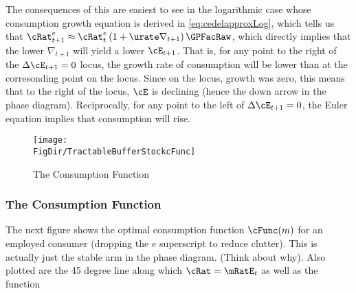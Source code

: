 \documentclass{\handout}
\begin{document}
The consequences of this are easiest to see in the logarithmic case whose consumption growth equation is derived in \eqref{eq:cedelapproxLog}, which tells us that ${\cRat}^{e}_{t+1} \approx {\cRat}^{e}_{t}\left(1+ \urate \nabla _{t+1}\right) {\GPFacRaw}$, which directly 
implies that the lower $\nabla_{t+1}$ will yield a lower $\cE_{t+1}$.  That is, for any point to the right of the $\Delta \cE_{t+1}=0$ locus, the growth rate of consumption will be lower than at the corresonding point on the locus.  Since on the locus, growth
was zero, this means that to the right of the locus, $\cE$ is declining (hence the down arrow in the phase diagram).  Reciprocally, for any point to the left of $\Delta \cE_{t+1}=0$, the Euler equation implies that consumption will rise.

\begin{figure}
\caption{The Consumption Function}\label{fig:cFunc}
\texttt{[image: \\FigDir/TractableBufferStockcFunc]}
\end{figure}

\subsubsection{The Consumption Function}
The next figure shows the optimal consumption function $\cFunc(m)$ for an
employed consumer (dropping the $e$ superscript to reduce clutter).  This
is actually just the stable arm in the phase diagram.  (Think about
why).  Also plotted are the 45 degree line along which $\cRat = \mRatE_{t}$
as well as the function
\end{document}
